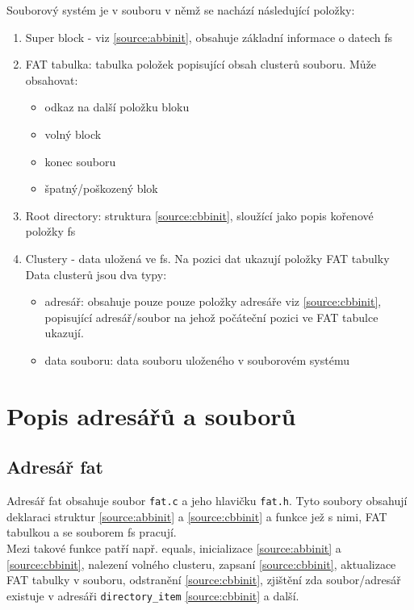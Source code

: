 \documentclass[12pt]{report}
\begin{document}
	Souborový systém je v souboru v němž se nachází následující položky:
	\begin{enumerate}
		\item Super block - viz \ref{source:abbinit}, obsahuje základní informace o datech fs
		\item FAT tabulka:  tabulka položek popisující obsah clusterů souboru. Může obsahovat:
		\begin{itemize}
			\item odkaz na další položku bloku
			\item volný block
			\item konec souboru
			\item špatný/poškozený blok
		\end{itemize}
		\item Root directory:	struktura \ref{source:cbbinit}, sloužící jako popis kořenové položky fs
		\item Clustery - data uložená ve fs. Na pozici dat ukazují položky FAT tabulky\\
		Data clusterů jsou dva typy:
		\begin{itemize}
			\item adresář: obsahuje pouze pouze položky adresáře viz \ref{source:cbbinit}, popisující adresář/soubor na jehož počáteční pozici ve FAT tabulce ukazují.
			\item data souboru: data souboru uloženého v souborovém systému
		\end{itemize}
	\end{enumerate}

	\section*{Popis adresářů a souborů}
	\subsection*{Adresář fat}
	Adresář fat obsahuje soubor \texttt{fat.c} a jeho hlavičku \texttt{fat.h}. Tyto soubory obsahují deklaraci struktur \ref{source:abbinit} a \ref{source:cbbinit} a funkce jež s nimi, FAT tabulkou a se souborem fs pracují.\\
	Mezi takové funkce patří např. equals, inicializace \ref{source:abbinit} a \ref{source:cbbinit}, nalezení volného clusteru, zapsaní \ref{source:cbbinit}, aktualizace FAT tabulky v souboru, odstranění \ref{source:cbbinit}, zjištění zda soubor/adresář existuje v adresáři \texttt{directory\_item} \ref{source:cbbinit} a další.
	
\end{document}
